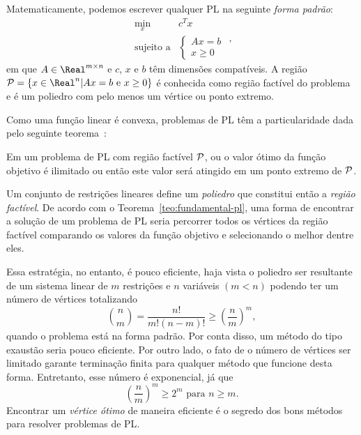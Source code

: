     
Matematicamente, podemos escrever qualquer \ac{PL} na seguinte \emph{forma
padrão}:
\begin{equation} \label{eq:introPL-primal}
	\begin{array}{lc}
\displaystyle \min_{x} & c^Tx \\
\text{sujeito a} &\begin{cases} Ax = b \\
				 x \geq 0	
				 \end{cases}
\end{array},
\end{equation}
em que $A\in \Real^{m\times n}$ e $c$, $x$ e $b$ têm dimensões compatíveis. A
região $\Pset = \{x\in\Real^n | Ax=b \text{ e } x\geq 0\}$ é conhecida como
região factível do problema e é um poliedro com pelo menos um vértice ou
ponto extremo.

Como uma função linear é convexa, problemas de \ac{PL} têm a particularidade
dada pelo seguinte
teorema~\cite[cap.~3]{Bazaraa:2009uu}:

\begin{teo} \label{teo:fundamental-pl} Em um
problema de \acl{PL} com região factível $\mathcal{P}$, ou o valor ótimo da função objetivo é  ilimitado ou então este valor
será atingido em um ponto extremo de  $\mathcal{P}$.
\end{teo}


Um conjunto de restrições lineares define um \emph{poliedro} que constitui
então a \emph{região factível}. De acordo com o
Teorema~\ref{teo:fundamental-pl}, uma forma de encontrar a solução de um
problema de \ac{PL} seria percorrer todos os vértices da região factível
comparando os valores da função objetivo e selecionando o melhor dentre eles.

Essa estratégia, no entanto, é pouco eficiente, haja vista o poliedro ser
resultante de um sistema linear de	$m$ restrições e $n$  variáveis $(m<n)$
podendo ter um número de vértices totalizando
\[ 
\binom{n}{m} = \dfrac{n!}{m!(n-m)!} \geq 
\left(\dfrac{n}{m}\right)^m,
\]
quando o problema está na forma padrão. Por conta disso, um método do tipo
exaustão seria pouco eficiente. Por outro lado, o fato de o número de vértices
ser limitado garante terminação finita para qualquer método que funcione desta
forma. Entretanto, esse número é exponencial,
já que 
\[
\left(\dfrac{n}{m}\right)^m \geq 2^m  \text{ para }   n\geq m.
\]
Encontrar um \emph{vértice ótimo} de maneira  eficiente é o
segredo dos bons métodos para resolver problemas de \ac{PL}.

